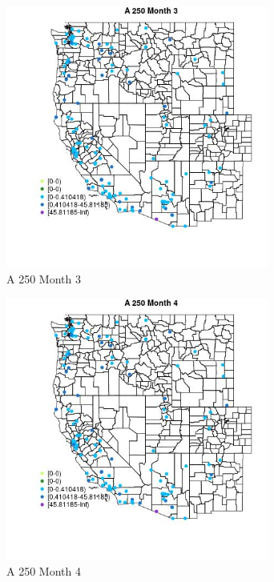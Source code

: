 \begin{figure} 
\centering  
\includegraphics[width=0.77\textwidth]{Code_Outputs/Report_ML_input_PM25_Step4_part_e_de_duplicated_aves_MapObsMo3A_250.jpg} 
\caption{\label{fig:Report_ML_input_PM25_Step4_part_e_de_duplicated_avesMapObsMo3A_250}A 250 Month 3} 
\end{figure} 
 

\begin{figure} 
\centering  
\includegraphics[width=0.77\textwidth]{Code_Outputs/Report_ML_input_PM25_Step4_part_e_de_duplicated_aves_MapObsMo4A_250.jpg} 
\caption{\label{fig:Report_ML_input_PM25_Step4_part_e_de_duplicated_avesMapObsMo4A_250}A 250 Month 4} 
\end{figure} 
 

